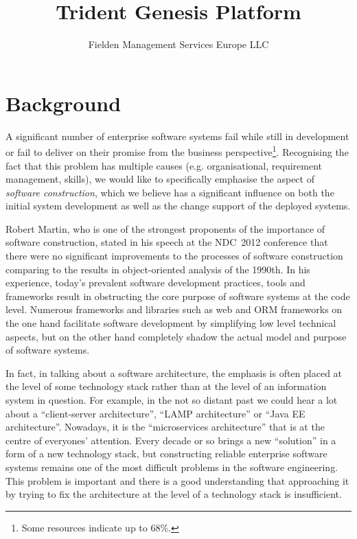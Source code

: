 \documentclass[a4paper,12pt,oneside,openright,final]{memoir} %
\title{Trident Genesis Platform}
\author{Fielden Management Services Europe LLC}
\date{}
\begin{document}
\maketitle
{}


\onehalfspacing


\section*{Background}

	A significant number of enterprise software systems fail while still in development or fail to deliver on their promise from the business perspective\footnote{Some resources indicate up to 68\%.}.  
  	Recognising the fact that this problem has multiple causes (e.g. organisational, requirement management, skills), we would like to specifically emphasise the aspect of \emph{software construction}, which we believe has a significant influence on both the initial system development as well as the change support of the deployed systems.  
  
  	Robert Martin, who is one of the strongest proponents of the importance of software construction, stated in his speech at the NDC~2012 conference that there were no significant improvements to the processes of software construction comparing to the results in object-oriented analysis of the 1990th. 
  	In his experience, today's prevalent software development practices, tools and frameworks result in obstructing the core purpose of software systems at the code level.
  	Numerous frameworks and libraries such as web and ORM frameworks on the one hand facilitate software development by simplifying low level technical aspects, but on the other hand completely shadow the actual model and purpose of software systems.  
  	
	In fact, in talking about a software architecture, the emphasis is often placed at the level of some technology stack rather than at the level of an information system in question.
	For example, in the not so distant past we could hear a lot about a ``client-server architecture'', ``LAMP architecture'' or ``Java EE architecture''.
	Nowadays, it is the ``microservices architecture'' that is at the centre of everyones' attention.
	Every decade or so brings a new ``solution'' in a form of a new technology stack, but constructing reliable enterprise software systems remains one of the most difficult problems in the software engineering.	
	This problem is important and there is a good understanding that approaching it by trying to fix the architecture at the level of a technology stack is insufficient.
\end{document}
